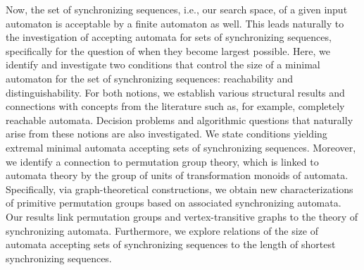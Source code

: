 Now, the set of synchronizing 
sequences, i.e., our search space, of a given input automaton
is acceptable by a finite automaton as well.
This leads naturally to the investigation of accepting automata for sets
of synchronizing sequences, specifically for the question of when they
become largest possible.
Here,  we identify and investigate two conditions
that control the size of a minimal automaton
for the set of synchronizing sequences:
reachability and distinguishability.
For both notions, we establish various structural results and connections with concepts
from the literature such as, for example, completely reachable automata.
Decision problems and algorithmic questions 
that naturally arise
from these notions are also investigated.
We state conditions yielding extremal minimal automata accepting sets of synchronizing sequences.
Moreover, we identify a connection to permutation group theory, which 
is linked to automata theory by the group of units
of transformation monoids of automata.
Specifically, via graph-theoretical constructions,
we obtain new characterizations of primitive permutation groups
based on associated synchronizing automata.
Our results link permutation groups and vertex-transitive graphs
to the theory of synchronizing automata.
Furthermore, we explore relations of the size of automata accepting sets of synchronizing
sequences to the length of shortest synchronizing sequences.